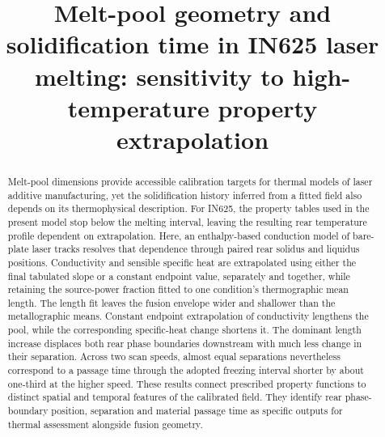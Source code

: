 \title{Melt-pool geometry and solidification time in IN625 laser melting: sensitivity to high-temperature property extrapolation}
\begin{abstract}
Melt-pool dimensions provide accessible calibration targets for thermal models of laser additive manufacturing, yet the solidification history inferred from a fitted field also depends on its thermophysical description. For IN625, the property tables used in the present model stop below the melting interval, leaving the resulting rear temperature profile dependent on extrapolation. Here, an enthalpy-based conduction model of bare-plate laser tracks resolves that dependence through paired rear solidus and liquidus positions. Conductivity and sensible specific heat are extrapolated using either the final tabulated slope or a constant endpoint value, separately and together, while retaining the source-power fraction fitted to one condition's thermographic mean length. The length fit leaves the fusion envelope wider and shallower than the metallographic means. Constant endpoint extrapolation of conductivity lengthens the pool, while the corresponding specific-heat change shortens it. The dominant length increase displaces both rear phase boundaries downstream with much less change in their separation. Across two scan speeds, almost equal separations nevertheless correspond to a passage time through the adopted freezing interval shorter by about one-third at the higher speed. These results connect prescribed property functions to distinct spatial and temporal features of the calibrated field. They identify rear phase-boundary position, separation and material passage time as specific outputs for thermal assessment alongside fusion geometry.
\end{abstract}
